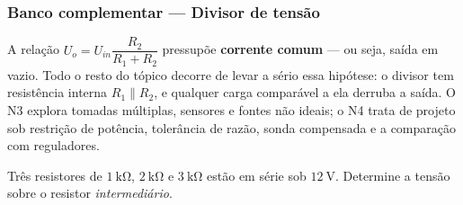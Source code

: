 
\subsubsection*{Banco complementar --- Divisor de tensão}

\begin{atencao}
A relação $U_o=U_{in}\dfrac{R_2}{R_1+R_2}$ pressupõe \textbf{corrente comum} ---
ou seja, saída em vazio. Todo o resto do tópico decorre de levar a sério essa
hipótese: o divisor tem resistência interna $R_1\parallel R_2$, e qualquer carga
comparável a ela derruba a saída. O N3 explora tomadas múltiplas, sensores e
fontes não ideais; o N4 trata de projeto sob restrição de potência, tolerância
de razão, sonda compensada e a comparação com reguladores.
\end{atencao}

\blocofixacao

\begin{questao}[1]{}
Três resistores de $\SI{1}{\kilo\ohm}$, $\SI{2}{\kilo\ohm}$ e
$\SI{3}{\kilo\ohm}$ estão em série sob $\SI{12}{\volt}$. Determine a tensão
sobre o resistor \emph{intermediário}.
\end{questao}

